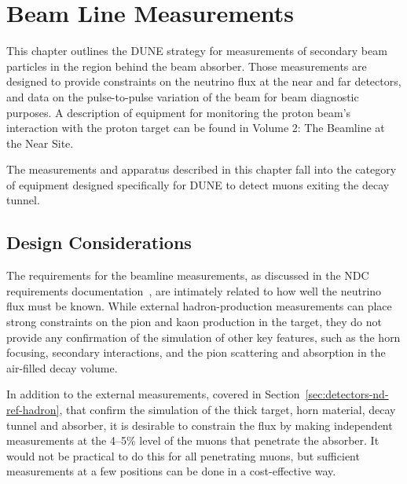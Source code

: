 \section{Beam Line Measurements} 
\label{sec:detectors-nd-ref-blm}

This chapter outlines the DUNE strategy for measurements of secondary
beam particles in the region behind the beam absorber. 
Those measurements are designed to provide constraints 
on the neutrino flux at the near and far
detectors, and data on the pulse-to-pulse variation
of the beam for beam diagnostic purposes. A description of equipment
for monitoring the proton beam's interaction with the proton target
can be found in Volume 2: The Beamline at the Near Site. 

The measurements and apparatus described in this chapter fall into
the category of equipment designed specifically for DUNE to
detect muons exiting the decay tunnel. 

\subsection{Design Considerations}
\label{subsec:detectors-nd-blm-design}

The requirements for the beamline measurements, as discussed in the
NDC requirements documentation~\cite{nd_requirements_doc},  are intimately related to how well the neutrino flux
must be known.
While external hadron-production measurements can place strong 
constraints on the pion and kaon production in the target, they do not 
provide any confirmation of the simulation of other key features, such 
as the horn focusing, secondary interactions, and the 
pion scattering and absorption in the air-filled decay volume. 

In addition to the external measurements, covered in
Section~\ref{sec:detectors-nd-ref-hadron}, that confirm the
simulation of the thick target, horn material, decay tunnel and
absorber, it is desirable to constrain the flux by making independent
measurements at the 4--5\% level of the muons that penetrate the
absorber. It would not be practical to do this for all penetrating
muons, but sufficient measurements at a few positions can be done in a
cost-effective way.
%

